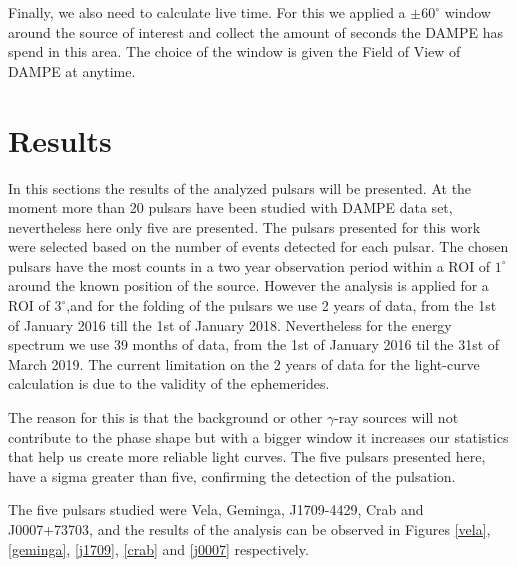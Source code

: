 \documentclass{PoS}
\begin{document}
Finally, we also need to calculate live time. For this we applied a $ \pm 60^{\circ}$ window around the source of interest and collect the amount of seconds the DAMPE has spend in this area. The choice of the window is given the Field of View of DAMPE at anytime.


\section{Results}
In this  sections  the  results of the analyzed pulsars will be presented. At the moment more than 20 pulsars have been  studied with DAMPE data set, nevertheless here only five are presented. The pulsars presented for this work were selected based on the number of events detected for each pulsar. The chosen pulsars have the most counts  in a  two year observation period within a ROI of $1^\circ$ around the known position of the source. However the analysis is applied  for a ROI of $3^\circ$,and for the folding of the pulsars we use 2 years of data, from the 1st of January 2016 till the 1st of January 2018.  Nevertheless for the  energy spectrum we use 39 months of data, from the 1st of January 2016 til the  31st of March 2019. The current limitation on the 2 years of data for the  light-curve calculation is due to the validity of the ephemerides.

 The reason for this is that  the background or other $\gamma$-ray sources will not contribute  to the phase shape but with a bigger window it increases our statistics that help us create more reliable  light curves. The five pulsars presented here, have a sigma greater than five, confirming the detection of the pulsation.

The five pulsars studied were Vela, Geminga, J1709-4429, Crab and J0007+73703, and the results of the analysis can be observed in Figures \ref{vela}, \ref{geminga}, \ref{j1709}, \ref{crab} and \ref{j0007} respectively.
\end{document}

